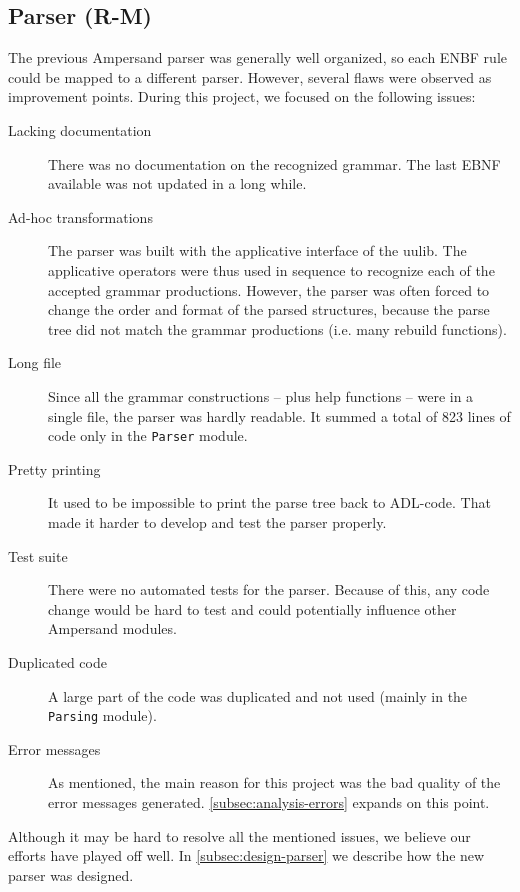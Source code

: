 \subsection{Parser (R-M)}
\label{subsec:analysis-parser}
The previous Ampersand parser was generally well organized, so each ENBF rule could be mapped to a different parser.
However, several flaws were observed as improvement points.
During this project, we focused on the following issues:
\begin{description}
  \item[Lacking documentation]
    There was no documentation on the recognized grammar.
    The last EBNF available was not updated in a long while.
  
  \item[Ad-hoc transformations]
    The parser was built with the applicative interface of the uulib.
    The applicative operators were thus used in sequence to recognize each of the accepted grammar productions.
    However, the parser was often forced to change the order and format of the parsed structures, because the parse tree did not match the grammar productions (i.e. many rebuild functions).
    
  \item[Long file]
    Since all the grammar constructions -- plus help functions -- were in a single file, the parser was hardly readable.
    It summed a total of 823 lines of code only in the \texttt{Parser} module.
  
  \item[Pretty printing]
    It used to be impossible to print the parse tree back to ADL-code.
    That made it harder to develop and test the parser properly.
  
  \item[Test suite]
    There were no automated tests for the parser.
    Because of this, any code change would be hard to test and could potentially influence other Ampersand modules.
  
  \item[Duplicated code]
    A large part of the code was duplicated and not used (mainly in the \texttt{Parsing} module).
  
  \item[Error messages]
    As mentioned, the main reason for this project was the bad quality of the error messages generated.
    \autoref{subsec:analysis-errors} expands on this point.
\end{description}
%
Although it may be hard to resolve all the mentioned issues, we believe our efforts have played off well.
In \autoref{subsec:design-parser} we describe how the new parser was designed.

